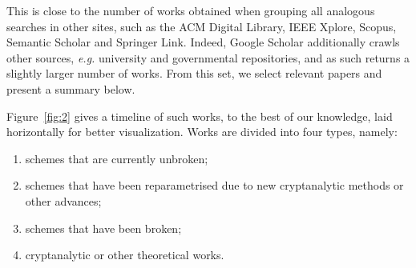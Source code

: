 \documentclass[openright, landscape]{report}
\begin{document}
This is close to the number of works obtained when grouping all analogous searches in other sites, such as the ACM Digital Library, IEEE Xplore, Scopus, Semantic Scholar and Springer Link. Indeed, Google Scholar additionally crawls other sources, \emph{e.g.} university and governmental repositories, and as such returns a slightly larger number of works. From this set, we select relevant papers and present a summary below.

Figure~\ref{fig:2} gives a timeline of such works, to the best of our knowledge, laid horizontally for better visualization. Works are divided into four types, namely:

\begin{enumerate}[label=(\roman*), itemsep=1pt]
  \item\label{enum:i} schemes that are currently unbroken;
  \item\label{enum:ii} schemes that have been reparametrised due to new cryptanalytic methods or other advances;
  \item\label{enum:iii} schemes that have been broken;
  \item\label{enum:iv} cryptanalytic or other theoretical works.
\end{enumerate}

\end{document}
